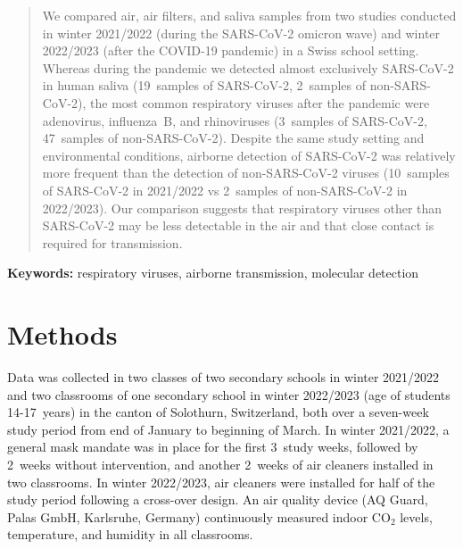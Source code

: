 \documentclass[fleqn,11pt]{wlscirep}
\begin{document}
\begin{abstract}\normalfont
\noindent We compared air, air filters, and saliva samples from two studies conducted in winter 2021/2022 (during the SARS-CoV-2 omicron wave) and winter 2022/2023 (after the COVID-19 pandemic) in a Swiss school setting. Whereas during the pandemic we detected almost exclusively SARS-CoV-2 in human saliva (19~samples of SARS-CoV-2, 2~samples of non-SARS-CoV-2), the most common respiratory viruses after the pandemic were adenovirus, influenza~B, and rhinoviruses (3~samples of SARS-CoV-2, 47~samples of non-SARS-CoV-2). Despite the same study setting and environmental conditions, airborne detection of SARS-CoV-2 was relatively more frequent than the detection of non-SARS-CoV-2 viruses (10~samples of SARS-CoV-2 in 2021/2022 vs 2~samples of non-SARS-CoV-2 in 2022/2023). Our comparison suggests that respiratory viruses other than SARS-CoV-2 may be less detectable in the air and that close contact is required for transmission. \medskip

\par
\end{abstract}

\flushbottom
\maketitle

\vspace{2em}

\vspace{0.5em}

\noindent\textbf{Keywords:} respiratory viruses, airborne transmission, molecular detection

\thispagestyle{empty}
\sloppy
\raggedbottom

\newpage

\setcounter{page}{1}



\section*{Methods}

Data was collected in two classes of two secondary schools in winter 2021/2022 and two classrooms of one secondary school in winter 2022/2023 (age of students 14-17~years) in the canton of Solothurn, Switzerland, both over a seven-week study period from end of January to beginning of March. In winter 2021/2022, a general mask mandate was in place for the first 3~study weeks, followed by 2~weeks without intervention, and another 2~weeks of air cleaners installed in two classrooms. In winter 2022/2023, air cleaners were installed for half of the study period following a cross-over design. An air quality device (AQ Guard, Palas GmbH, Karlsruhe, Germany) continuously measured indoor CO$_2$ levels, temperature, and humidity in all classrooms. 
\end{document}
